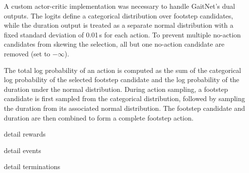 A custom actor-critic implementation was necessary to handle
GaitNet's dual outputs. The logits define a categorical distribution
over footstep candidates, while the duration output is treated as a
separate normal distribution with a fixed standard deviation of
0.01\,s for each action. To prevent multiple no-action candidates
from skewing the selection, all but one no-action candidate are
removed (set to $-\infty$).

The total log probability of an action is computed as the sum of the
categorical log probability of the selected footstep candidate and
the log probability of the duration under the normal distribution.
During action sampling, a footstep candidate is first sampled from
the categorical distribution, followed by sampling the duration from
its associated normal distribution. The footstep candidate and
duration are then combined to form a complete footstep action.

\begin{todo}
  detail rewards
\end{todo}

\begin{todo}
  detail events
\end{todo}

\begin{todo}
  detail terminations
\end{todo}
